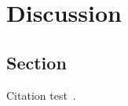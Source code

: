 
\chapter{Discussion}\label{chapter:discussion}

\section{Section}
Citation test~\parencite{latex}.
